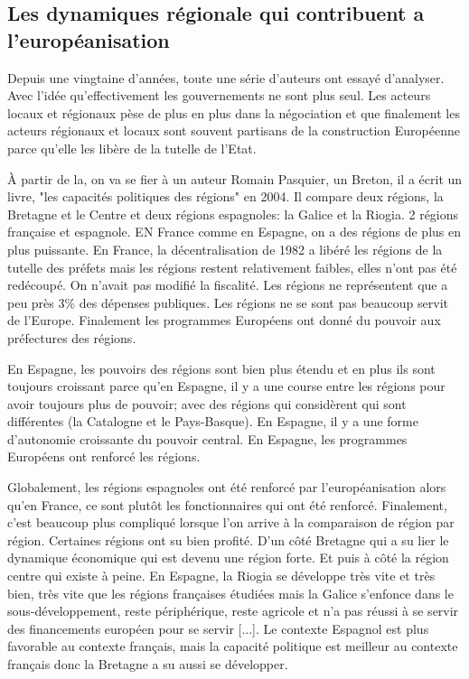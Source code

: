 \subsection{Les dynamiques régionale qui contribuent a l'européanisation}

Depuis une vingtaine d'années, toute une série d'auteurs ont essayé d'analyser. Avec l'idée qu'effectivement les gouvernements ne sont plus seul. Les acteurs locaux et régionaux pèse de plus en plus dans la négociation et que finalement les acteurs régionaux et locaux sont souvent partisans de la construction Européenne parce qu'elle les libère de la tutelle de l'Etat.

À partir de la, on va se fier à un auteur Romain Pasquier, un Breton, il a écrit un livre, "les capacités politiques des régions" en 2004. Il compare deux régions, la Bretagne et le Centre et deux régions espagnoles: la Galice et la Riogia. 2 régions française et espagnole. EN France comme en Espagne, on a des régions de plus en plus puissante. En France, la décentralisation de 1982 a libéré les régions de la tutelle des préfets mais les régions restent relativement faibles, elles n'ont pas été redécoupé. On n’avait pas modifié la fiscalité. Les régions ne représentent que a peu près 3\% des dépenses publiques. Les régions ne se sont pas beaucoup servit de l'Europe. Finalement les programmes Européens ont donné du pouvoir aux préfectures des régions.

En Espagne, les pouvoirs des régions sont bien plus étendu et en plus ils sont toujours croissant parce qu'en Espagne, il y a une course entre les régions pour avoir toujours plus de pouvoir; avec des régions qui considèrent qui sont différentes (la Catalogne et le Pays-Basque). En Espagne, il y a une forme d'autonomie croissante du pouvoir central. En Espagne, les programmes Européens ont renforcé les régions. 

Globalement, les régions espagnoles ont été renforcé par l'européanisation alors qu'en France, ce sont plutôt les fonctionnaires qui ont été renforcé. Finalement, c'est beaucoup plus compliqué lorsque l'on arrive à la comparaison de région par région. Certaines régions ont su bien profité. D'un côté Bretagne qui a su lier le dynamique économique qui est devenu une région forte. Et puis à côté la région centre qui existe à peine.
En Espagne, la Riogia se développe très vite et très bien, très vite que les régions françaises étudiées mais la Galice s'enfonce dans le sous-développement, reste périphérique, reste agricole et n'a pas réussi à se servir des financements européen pour se servir [...].
Le contexte Espagnol est plus favorable au contexte français, mais la capacité politique est meilleur au contexte français donc la Bretagne a su aussi se développer.

